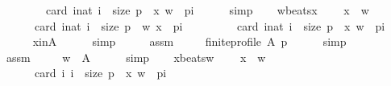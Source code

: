 \begin{isabellebody}
\ \ \ \ \ \ \ \ card\ {\isacharbraceleft}{\kern0pt}i{\isacharcolon}{\kern0pt}{\isacharcolon}{\kern0pt}nat{\isachardot}{\kern0pt}\ i\ {\isacharless}{\kern0pt}\ size\ p\ {\isasymand}\ {\isacharparenleft}{\kern0pt}x{\isacharcomma}{\kern0pt}\ w{\isacharparenright}{\kern0pt}\ {\isasymin}\ p{\isacharbang}{\kern0pt}i{\isacharbraceright}{\kern0pt}{\isacharparenright}{\kern0pt}{\isachardoublequoteclose}\isanewline
\ \ \ \ \isamarkupfalse%
\ simp\isanewline
\ \ \isamarkupfalse%
\ w{\isacharunderscore}{\kern0pt}beats{\isacharunderscore}{\kern0pt}x{\isacharcolon}{\kern0pt}\isanewline
\ \ \ \ {\isachardoublequoteopen}x\ {\isasymnoteq}\ w\ {\isasymLongrightarrow}\isanewline
\ \ \ \ \ \ card\ {\isacharbraceleft}{\kern0pt}i{\isacharcolon}{\kern0pt}{\isacharcolon}{\kern0pt}nat{\isachardot}{\kern0pt}\ i\ {\isacharless}{\kern0pt}\ size\ p\ {\isasymand}\ {\isacharparenleft}{\kern0pt}w{\isacharcomma}{\kern0pt}\ x{\isacharparenright}{\kern0pt}\ {\isasymin}\ p{\isacharbang}{\kern0pt}i{\isacharbraceright}{\kern0pt}\ {\isacharless}{\kern0pt}\isanewline
\ \ \ \ \ \ \ \ card\ {\isacharbraceleft}{\kern0pt}i{\isacharcolon}{\kern0pt}{\isacharcolon}{\kern0pt}nat{\isachardot}{\kern0pt}\ i\ {\isacharless}{\kern0pt}\ size\ p\ {\isasymand}\ {\isacharparenleft}{\kern0pt}x{\isacharcomma}{\kern0pt}\ w{\isacharparenright}{\kern0pt}\ {\isasymin}\ p{\isacharbang}{\kern0pt}i{\isacharbraceright}{\kern0pt}{\isachardoublequoteclose}\isanewline
\ \ \ \ \isamarkupfalse%
\ x{\isacharunderscore}{\kern0pt}in{\isacharunderscore}{\kern0pt}A\isanewline
\ \ \ \ \isamarkupfalse%
\ simp\isanewline
\ \ \isamarkupfalse%
\ \isamarkupfalse%
\ assm\ \isamarkupfalse%
\isanewline
\ \ \ \ {\isachardoublequoteopen}finite{\isacharunderscore}{\kern0pt}profile\ A\ p{\isachardoublequoteclose}\isanewline
\ \ \ \ \isamarkupfalse%
\ simp\isanewline
\ \ \isamarkupfalse%
\ \isamarkupfalse%
\ assm\ \isamarkupfalse%
\isanewline
\ \ \ \ {\isachardoublequoteopen}w\ {\isasymin}\ A{\isachardoublequoteclose}\isanewline
\ \ \ \ \isamarkupfalse%
\ simp\isanewline
\ \ \isamarkupfalse%
\ x{\isacharunderscore}{\kern0pt}beats{\isacharunderscore}{\kern0pt}w{\isacharcolon}{\kern0pt}\isanewline
\ \ \ \ {\isachardoublequoteopen}x\ {\isasymnoteq}\ w\ {\isasymLongrightarrow}\isanewline
\ \ \ \ \ \ card\ {\isacharbraceleft}{\kern0pt}i{\isachardot}{\kern0pt}\ i\ {\isacharless}{\kern0pt}\ size\ p\ {\isasymand}\ {\isacharparenleft}{\kern0pt}x{\isacharcomma}{\kern0pt}\ w{\isacharparenright}{\kern0pt}\ {\isasymin}\ p{\isacharbang}{\kern0pt}i{\isacharbraceright}{\kern0pt}\ {\isacharless}{\kern0pt}\isanewline

\end{isabellebody}
